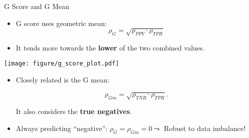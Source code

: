 \documentclass[11pt,compress,t,notes=noshow, xcolor=table]{beamer}
\begin{document}
\begin{vbframe}{G Score and G Mean}
	\footnotesize
	
	\begin{minipage}[c]{0.5\textwidth}
	\footnotesize
	\begin{itemize}
		\item G score uses geometric mean: 
		$$\rho_{G} = \sqrt{\rho_{PPV} \cdot \rho_{TPR}}$$
		\item It tends more towards the \textbf{lower} of the two combined values.
	\end{itemize}
\end{minipage}%
\begin{minipage}[c]{0.5\textwidth}
	\centering
	\texttt{[image: figure/g\_score\_plot.pdf]}
\end{minipage}

\begin{itemize}
	\item Closely related is the G mean:

	$$\rho_{Gm} = \sqrt{\rho_{TNR} \cdot \rho_{TPR}}.$$

	It also considers the \textbf{true negatives}.
	
	\item Always predicting \enquote{negative}: $\rho_{G} = \rho_{Gm}  = 0 \leadsto$ Robust to data imbalance!

\end{itemize}
	
\end{vbframe}
\end{document}
